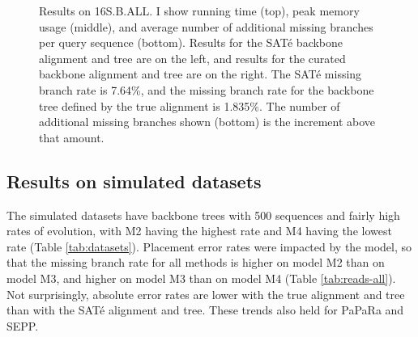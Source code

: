\begin{figure}[htbp]
  \caption{Results on 16S.B.ALL. I show running time (top), peak memory
usage (middle), and average number of additional missing branches per
query sequence (bottom).  Results for the SAT\'{e} backbone alignment and tree are on the
left, and results for the curated backbone alignment and tree are on the
right. The SAT\'{e} missing branch rate is 7.64\%, and the
missing branch rate for the backbone tree defined by the
true alignment is 1.835\%.  The number of additional missing
branches shown (bottom) is the increment above that amount.}
  \label{fig:bio-all}
\end{figure}

\vspace{.1in}
\subsection{Results on simulated datasets}
The simulated datasets have backbone trees with 500 sequences
and fairly high rates of evolution, with M2 having the highest
rate and M4 having the lowest rate
(Table \ref{tab:datasets}).
Placement error rates were impacted by
the model, 
so that the missing branch rate
for all methods is higher on model M2 than on model M3,
and higher on model M3 than on model M4 (Table \ref{tab:reads-all}).
Not surprisingly, 
 absolute error rates are lower
with the true alignment and tree than with the SAT\'{e}
alignment and tree. 
These trends also held for
PaPaRa and SEPP.


